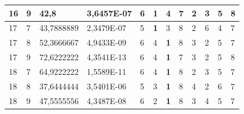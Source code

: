 \documentclass[conference]{IEEEtran}
\begin{document}
\begin{table}[]
\begin{tabular}{|llll|llllllll|}
		\multicolumn{1}{|l|}{16}  & \multicolumn{1}{l|}{9}         & \multicolumn{1}{l|}{42,8}          & 3,6457E-07 & \multicolumn{1}{l|}{6}   & \multicolumn{1}{l|}{\textbf{1}} & \multicolumn{1}{l|}{4}          & \multicolumn{1}{l|}{7}   & \multicolumn{1}{l|}{2}          & \multicolumn{1}{l|}{3}          & \multicolumn{1}{l|}{5}          & 8                      \\ \hline
		\multicolumn{1}{|l|}{17}  & \multicolumn{1}{l|}{7}         & \multicolumn{1}{l|}{43,7888889}    & 2,3479E-07 & \multicolumn{1}{l|}{5}   & \multicolumn{1}{l|}{\textbf{1}} & \multicolumn{1}{l|}{3}          & \multicolumn{1}{l|}{8}   & \multicolumn{1}{l|}{2}          & \multicolumn{1}{l|}{6}          & \multicolumn{1}{l|}{4}          & 7                      \\ \hline
		\multicolumn{1}{|l|}{17}  & \multicolumn{1}{l|}{8}         & \multicolumn{1}{l|}{52,3666667}    & 4,9433E-09 & \multicolumn{1}{l|}{6}   & \multicolumn{1}{l|}{4}          & \multicolumn{1}{l|}{\textbf{1}} & \multicolumn{1}{l|}{8}   & \multicolumn{1}{l|}{3}          & \multicolumn{1}{l|}{2}          & \multicolumn{1}{l|}{5}          & 7                      \\ \hline
		\multicolumn{1}{|l|}{17}  & \multicolumn{1}{l|}{9}         & \multicolumn{1}{l|}{72,6222222}    & 4,3541E-13 & \multicolumn{1}{l|}{6}   & \multicolumn{1}{l|}{4}          & \multicolumn{1}{l|}{\textbf{1}} & \multicolumn{1}{l|}{7}   & \multicolumn{1}{l|}{3}          & \multicolumn{1}{l|}{2}          & \multicolumn{1}{l|}{5}          & 8                      \\ \hline
		\multicolumn{1}{|l|}{18}  & \multicolumn{1}{l|}{7}         & \multicolumn{1}{l|}{64,9222222}    & 1,5589E-11 & \multicolumn{1}{l|}{6}   & \multicolumn{1}{l|}{4}          & \multicolumn{1}{l|}{\textbf{1}} & \multicolumn{1}{l|}{8}   & \multicolumn{1}{l|}{2}          & \multicolumn{1}{l|}{3}          & \multicolumn{1}{l|}{5}          & 7                      \\ \hline
		\multicolumn{1}{|l|}{18}  & \multicolumn{1}{l|}{8}         & \multicolumn{1}{l|}{37,6444444}    & 3,5401E-06 & \multicolumn{1}{l|}{5}   & \multicolumn{1}{l|}{3}          & \multicolumn{1}{l|}{\textbf{1}} & \multicolumn{1}{l|}{8}   & \multicolumn{1}{l|}{4}          & \multicolumn{1}{l|}{2}          & \multicolumn{1}{l|}{6}          & 7                      \\ \hline
		\multicolumn{1}{|l|}{18}  & \multicolumn{1}{l|}{9}         & \multicolumn{1}{l|}{47,5555556}    & 4,3487E-08 & \multicolumn{1}{l|}{6}   & \multicolumn{1}{l|}{2}          & \multicolumn{1}{l|}{\textbf{1}} & \multicolumn{1}{l|}{8}   & \multicolumn{1}{l|}{3}          & \multicolumn{1}{l|}{4}          & \multicolumn{1}{l|}{5}          & 7                      \\ \hline

\end{tabular}
\end{table}
\end{document}
